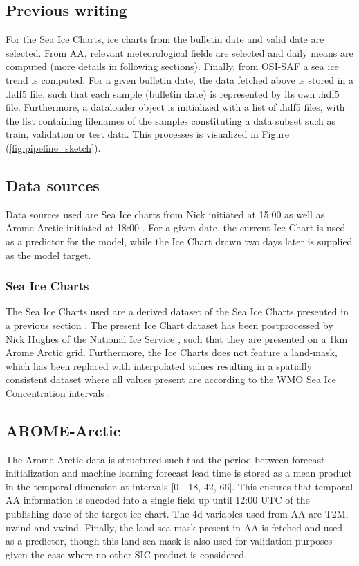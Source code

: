 \subsection{Previous writing}

For the Sea Ice Charts, ice charts from the bulletin date and valid date are selected. From AA, relevant meteorological fields are selected and daily means are computed (more details in following sections). Finally, from OSI-SAF a sea ice trend is computed. For a given bulletin date, the data fetched above is stored in a .hdf5 file, such that each sample (bulletin date) is represented by its own .hdf5 file. Furthermore, a dataloader object is initialized with a list of .hdf5 files, with the list containing filenames of the samples constituting a data subset such as train, validation or test data. This processes is visualized in Figure (\ref{fig:pipeline_sketch}).


\subsection{Data sources}
Data sources used are Sea Ice charts from Nick initiated at 15:00 as well as Arome Arctic initiated at 18:00 \cite{Dinessen2020,Mueller2017}. For a given date, the current Ice Chart is used as a predictor for the model, while the Ice Chart drawn two days later is supplied as the model target.

\subsubsection{Sea Ice Charts}
The Sea Ice Charts used are a derived dataset of the Sea Ice Charts presented in a previous section . The present Ice Chart dataset has been postprocessed by Nick Hughes of the National Ice Service , such that they are presented on a 1km Arome Arctic grid. Furthermore, the Ice Charts does not feature a land-mask, which has been replaced with interpolated values resulting in a spatially consistent dataset where all values present are according to the WMO Sea Ice Concentration intervals \cite{JETSI2014}. 

\subsection{AROME-Arctic}
The Arome Arctic data is structured such that the period between forecast initialization and machine learning forecast lead time is stored as a mean product in the temporal dimension at intervals [0 - 18, 42, 66]. This ensures that temporal AA information is encoded into a single field up until 12:00 UTC of the publishing date of the target ice chart. The 4d variables used from AA are T2M, uwind and vwind. Finally, the land sea mask present in AA is fetched and used as a predictor, though this land sea mask is also used for validation purposes given the case where no other SIC-product is considered.

